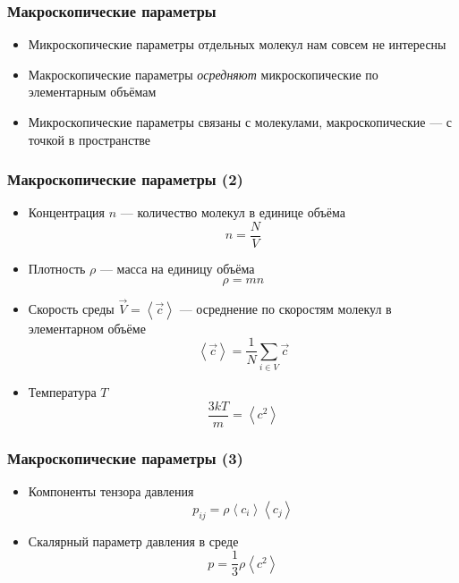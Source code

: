 \documentclass[onlymath]{beamer}
\newcommand\avg[1]{\left\langle{#1}\right\rangle}
\begin{document}
\begin{frame}
  \frametitle{Макроскопические параметры}
  \begin{itemize}
  \item Микроскопические параметры отдельных молекул нам совсем не интересны
  \item Макроскопические параметры \emph{осредняют} микроскопические
    по элементарным объёмам
  \item Микроскопические параметры связаны с молекулами,
    макроскопические — с точкой в пространстве
  \end{itemize}
\end{frame}

\begin{frame}
  \frametitle{Макроскопические параметры (2)}
  \begin{itemize}
  \item Концентрация $n$ — количество молекул в единице объёма
    \begin{equation*}
      n = \frac{N}{V}
    \end{equation*}
  \item Плотность $\rho$ — масса на единицу объёма
    \begin{equation*}
      \rho = m n
    \end{equation*}
  \item Скорость среды $\vec{V}=\avg{\vec{c}}$ — осреднение по скоростям молекул в
    элементарном объёме
    \begin{equation*}
      \avg{\vec{c}} = \frac{1}{N}\sum_{i \in V}{\vec{c}}
    \end{equation*}
  \item Температура $T$
    \begin{equation*}
      \frac{3kT}{m} = \avg{c^2}
    \end{equation*}
  \end{itemize}
\end{frame}

\begin{frame}
  \frametitle{Макроскопические параметры (3)}
  \begin{itemize}
  \item Компоненты тензора давления
    \begin{equation*}
      p_{ij} = \rho \avg{c_i} \avg{c_j}
    \end{equation*}
  \item Скалярный параметр давления в среде
    \begin{equation*}
      p = \frac{1}{3}\rho\avg{c^2}
    \end{equation*}
  \end{itemize}
\end{frame}
\end{document}
